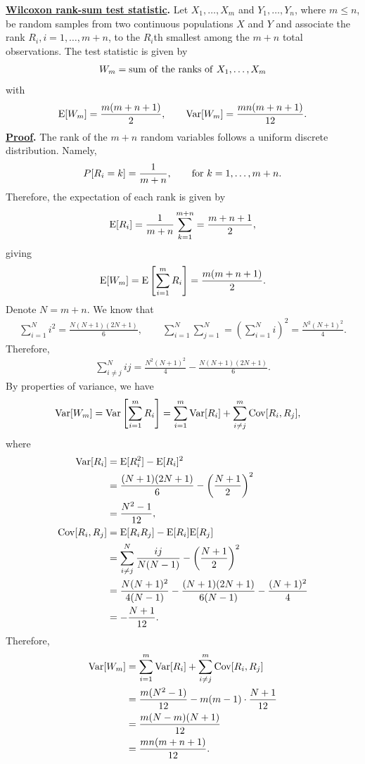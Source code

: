 \textbf{\underline{Wilcoxon rank-sum test statistic}.} Let $X_1, \ldots, X_m$ and $Y_1, \ldots, Y_n$, where $m\leq n$, be random samples from two continuous populations $X$ and $Y$ and associate the rank $R_i, i = 1,\ldots, m+n$, to the $R_i$th smallest among the $m+n$ total observations. The test statistic is given by
\begin{align*}
W_m = \mathrm{sum\ of\ the\ ranks\ of\ } X_1, \ldots, X_m
\end{align*}
with
\begin{align*}
\mathrm{E}[W_m] = \frac{m(m+n+1)}{2}, \qquad \mathrm{Var}[W_m] = \frac{mn(m+n+1)}{12}.
\end{align*}
\textbf{\underline{Proof}.} The rank of the $m+n$ random variables follows a uniform discrete distribution. Namely,
\begin{align*}
P[R_i = k] = \frac{1}{m+n}, \qquad \mathrm{for\ } k = 1, \ldots, m+n.
\end{align*}
Therefore, the expectation of each rank is given by
\begin{align*}
\mathrm{E}[R_i] = \frac{1}{m+n} \sum_{k=1}^{m+n} = \frac{m+n+1}{2},
\end{align*}
giving
\begin{align*}
\mathrm{E}[W_m] = \mathrm{E}\left[\sum_{i=1}^m R_i \right] = \frac{m(m+n+1)}{2}.
\end{align*}
Denote $N = m + n$. We know that
\begin{align*}
\sum_{i=1}^{N} i^2 = \frac{N(N+1)(2N+1)}{6}, \qquad \sum_{i=1}^{N}\sum_{j=1}^N = \left(\sum_{i=1}^{N} i \right)^2 = \frac{N^2(N+1)^2}{4}.
\end{align*}
Therefore,
\begin{align*}
\sum_{i\neq j}^{N} ij = \frac{N^2(N+1)^2}{4} - \frac{N(N+1)(2N+1)}{6}.
\end{align*}
By properties of variance, we have
\begin{align*}
\mathrm{Var}[W_m] & = \mathrm{Var}\left[\sum_{i=1}^m R_i\right] = \sum_{i=1}^m \mathrm{Var}[R_i] + \sum_{i\neq j}^m \mathrm{Cov}[R_i, R_j],
\end{align*}
where
\begin{align*}
\mathrm{Var}[R_i] & = \mathrm{E}[R_i^2] - \mathrm{E}[R_i]^2 \\
& = \frac{(N+1)(2N+1)}{6} - \left(\frac{N+1}{2} \right)^2 \\
& = \frac{N^2-1}{12}, \\
\mathrm{Cov}[R_i, R_j] & = \mathrm{E}[R_iR_j] - \mathrm{E}[R_i]\mathrm{E}[R_j] \\
& = \sum_{i\neq j}^N \frac{ij}{N(N-1)} - \left(\frac{N+1}{2} \right)^2 \\
& = \frac{N(N+1)^2}{4(N-1)} - \frac{(N+1)(2N+1)}{6(N-1)} - \frac{(N+1)^2}{4} \\
& = -\frac{N+1}{12}.
\end{align*}
Therefore,
\begin{align*}
\mathrm{Var}[W_m] & = \sum_{i=1}^m \mathrm{Var}[R_i] + \sum_{i\neq j}^m \mathrm{Cov}[R_i, R_j] \\
& = \frac{m(N^2-1)}{12} - m(m-1)\cdot \frac{N+1}{12} \\
& = \frac{m(N-m)(N+1)}{12} \\
& = \frac{mn(m+n+1)}{12}.
\end{align*}

